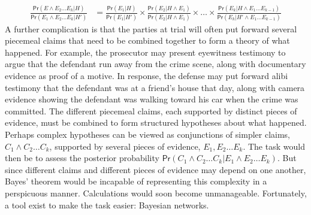 \documentclass{article}
\newcommand{\pr}{\mathsf{Pr}}
\begin{document}
\footnotesize
\begin{align*}
\frac{\pr(E \wedge E_2 \dots E_k \vert H)}{\pr(E_1\wedge E_2  \dots  E_k \vert H')} & = \frac{\pr(E_1 \vert H)} {\pr(E_1 \vert H')}
\times 
\frac{\pr(E_2 \vert H \wedge E_1)} {\pr(E_2 \vert H \wedge E_1)} 
\times \dots \times
\frac{\pr(E_k \vert H \wedge E_1 \dots E_{k-1} )} {\pr(E_k \vert H' \wedge E_1 \dots E_{k-1})} \end{align*}
%
\normalsize
A further complication is that the parties at trial will often put forward several piecemeal claims that 
need to be combined together to form a theory of what happened.  For example, the prosecutor may present eyewitness testimony to argue that the defendant run away from the crime scene, along with documentary evidence as proof of a motive. In response, the defense may put forward alibi testimony  that the defendant was at a friend's house that day, along with camera evidence showing the defendant was walking toward his car when the crime was committed.  The different piecemeal claims, each supported by  distinct pieces of evidence, must be combined to form structured hypotheses about what happened.
%
Perhaps complex hypotheses can be viewed as conjunctions of simpler claims, $C_1\wedge C_2 \dots C_k$, supported by several pieces of evidence, $E_1, E_2 \dots E_k$. The task would then be to assess the posterior probability $\pr(C_1\wedge C_2 \dots C_k \vert E_1 \wedge E_2 \dots E_k)$. But since  different claims and different 
pieces of evidence may depend on one another, Bayes' theorem would be incapable of representing this complexity in a perspicuous manner. Calculations would soon become unmanageable. 
Fortunately, a tool exist to make the
task easier: Bayesian networks. 

\end{document}
